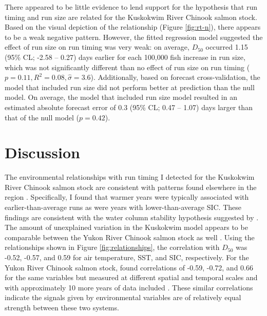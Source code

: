 \documentclass[12pt,]{book}
\theoremstyle{definition}
\theoremstyle{definition}
\theoremstyle{definition}
\theoremstyle{remark}
\begin{document}
\noindent
There appeared to be little evidence to lend support for the hypothesis
that run timing and run size are related for the Kuskokwim River Chinook
salmon stock. Based on the visual depiction of the relationship (Figure
\ref{fig:rt-n}), there appears to be a weak negative pattern. However,
the fitted regression model suggested the effect of run size on run
timing was very weak: on average, \(D_{50}\) occurred 1.15 (95\% CL;
-2.58 -- 0.27) days earlier for each 100,000 fish increase in run size,
which was not significantly different than no effect of run size on run
timing (\(p = 0.11, R^2 = 0.08, \hat{\sigma} = 3.6\)). Additionally,
based on forecast cross-validation, the model that included run size did
not perform better at prediction than the null model. On average, the
model that included run size model resulted in an estimated absolute
forecast error of 0.3 (95\% CL; 0.47 -- 1.07) days larger than that of
the null model (\(p = 0.42\)).

\section{Discussion}\label{discussion}

\noindent
The environmental relationships with run timing I detected for the
Kuskokwim River Chinook salmon stock are consistent with patterns found
elsewhere in the region
\citep[e.g.,][]{mundy-evenson-2011, hodgson-etal-2006}. Specifically, I
found that warmer years were typically associated with
earlier-than-average runs as were years with lower-than-average SIC.
These findings are consistent with the water column stability hypothesis
suggested by \citet{mundy-evenson-2011}. The amount of unexplained
variation in the Kuskokwim model appears to be comparable between the
Yukon River Chinook salmon stock as well \citep{mundy-evenson-2011}.
Using the relationships shown in Figure \ref{fig:relationships}, the
correlation with \(D_{50}\) was -0.52, -0.57, and 0.59 for air
temperature, SST, and SIC, respectively. For the Yukon River Chinook
salmon stock, \citet{mundy-evenson-2011} found correlations of -0.59,
-0.72, and 0.66 for the same variables but measured at different spatial
and temporal scales and with approximately 10 more years of data
included \citep[Table 2 in][]{mundy-evenson-2011}. These similar
correlations indicate the signals given by environmental variables are
of relatively equal strength between these two systems.
\end{document}
